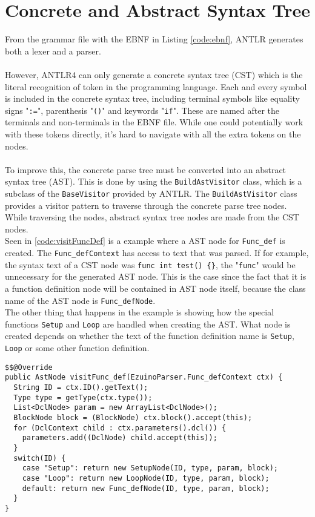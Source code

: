 \section{Concrete and Abstract Syntax Tree}
From the grammar file with the EBNF in Listing \ref{code:ebnf}, ANTLR generates both a lexer and a parser. 
\\\\
However, ANTLR4 can only generate a concrete syntax tree (CST) which is the literal recognition of token in the programming language. Each and every symbol is included in the concrete syntax tree, including terminal symbols like equality signs "\texttt{:=}", parenthesis  "\texttt{()}" and keywords "\texttt{if}". These are named after the terminals and non-terminals in the EBNF file. While one could potentially work with these tokens directly, it's hard to navigate with all the extra tokens on the nodes.
\\\\
To improve this, the concrete parse tree must be converted into an abstract syntax tree (AST). This is done by using the \texttt{BuildAstVisitor} class, which is a subclass of the \texttt{BaseVisitor} provided by ANTLR. The \texttt{BuildAstVisitor} class provides a visitor pattern to traverse through the concrete parse tree nodes. While traversing the nodes, abstract syntax tree nodes are made from the CST nodes.  \\
Seen in \ref{code:visitFuncDef} is a example where a AST node for \texttt{Func\_def} is created. The \texttt{Func\_defContext} has access to text that was parsed. If for example, the syntax text of a CST node was \texttt{func int test() \{\}}, the "\texttt{func}" would be unnecessary for the generated AST node. This is the case since the fact that it is a function definition node will be contained in AST node itself, because the class name of the AST node is \texttt{Func\_defNode}. \\
The other thing that happens in the example is showing how the special functions \texttt{Setup} and \texttt{Loop} are handled when creating the AST. What node is created depends on whether the text of the function definition name is \texttt{Setup}, \texttt{Loop} or some other function definition.
\\
\begin{lstlisting}[caption={Visit method for \texttt{Func\_defContext} in \texttt{AstBuildVisitor}}, label={code:visitFuncDef}]
$$@Override
public AstNode visitFunc_def(EzuinoParser.Func_defContext ctx) {
  String ID = ctx.ID().getText();
  Type type = getType(ctx.type());
  List<DclNode> param = new ArrayList<DclNode>();
  BlockNode block = (BlockNode) ctx.block().accept(this);
  for (DclContext child : ctx.parameters().dcl()) {
    parameters.add((DclNode) child.accept(this));
  }
  switch(ID) {
    case "Setup": return new SetupNode(ID, type, param, block);
    case "Loop": return new LoopNode(ID, type, param, block);
    default: return new Func_defNode(ID, type, param, block);
  }
}
\end{lstlisting}